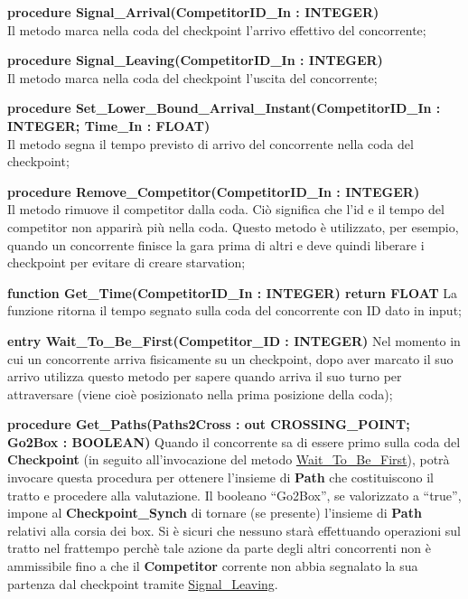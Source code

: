 \begin{description}
\item{\textbf{procedure Signal\_Arrival(CompetitorID\_In : INTEGER)}}\\
Il metodo marca nella coda del checkpoint l'arrivo effettivo del concorrente;
\item{\textbf{procedure Signal\_Leaving(CompetitorID\_In : INTEGER)}}\\
Il metodo marca nella coda del checkpoint l'uscita del concorrente;
\item{\textbf{procedure Set\_Lower\_Bound\_Arrival\_Instant(CompetitorID\_In : INTEGER; Time\_In : FLOAT)}}\\
Il metodo segna il tempo previsto di arrivo del concorrente nella coda del checkpoint;
\item{\textbf{procedure Remove\_Competitor(CompetitorID\_In : INTEGER)}}\\
Il metodo rimuove il competitor dalla coda. Ci\`{o} significa che l'id e il tempo del competitor non apparir\`{a} pi\`{u}
nella coda. Questo metodo \`{e} utilizzato, per esempio, quando un concorrente finisce la gara prima di altri
e deve quindi liberare i checkpoint per evitare di creare starvation;
\item{\textbf{function Get\_Time(CompetitorID\_In : INTEGER) return FLOAT}}
La funzione ritorna il tempo segnato sulla coda del concorrente con ID dato in input;
\item{\textbf{entry Wait\_To\_Be\_First(Competitor\_ID : INTEGER)}}
Nel momento in cui un concorrente arriva fisicamente su un checkpoint, dopo aver marcato il suo arrivo
utilizza questo metodo per sapere quando arriva il suo turno per attraversare (viene cio\`{e} posizionato nella prima posizione della coda);
\item{\textbf{procedure Get\_Paths(Paths2Cross : out CROSSING\_POINT;  Go2Box : BOOLEAN)}}
Quando il concorrente sa di essere primo sulla coda del \textbf{Checkpoint}
(in seguito all'invocazione del metodo \underline{Wait\_To\_Be\_First}), potr\`{a} invocare questa procedura per
ottenere l'insieme di \textbf{Path} che costituiscono il tratto e procedere alla valutazione. Il booleano ``Go2Box'', se valorizzato a ``true'',
impone al \textbf{Checkpoint\_Synch} di tornare (se presente) l'insieme di \textbf{Path} relativi alla corsia dei box.
Si \`{e} sicuri che nessuno star\`{a} effettuando operazioni sul tratto nel frattempo perch\`{e} tale azione da parte
degli altri concorrenti non \`{e} ammissibile fino a che il \textbf{Competitor} corrente non abbia segnalato la sua partenza dal checkpoint
tramite \underline{Signal\_Leaving}.
\end{description}
